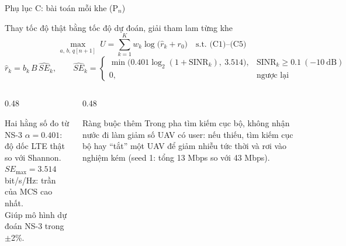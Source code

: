 \documentclass[aspectratio=169,10pt,t]{beamer}
\newcommand{\SE}{\widehat{SE}}
\begin{document}
\begin{frame}{Phụ lục C: bài toán mỗi khe (P$_n$)}
\begin{block}{Thay tốc độ thật bằng tốc độ dự đoán, giải tham lam từng khe}
\vspace{-3mm}
\[
\max_{a,\,b,\,q[n+1]}\ U = \sum_{k=1}^{K} w_k \log\big(\hat r_k + r_0\big)
\quad \text{s.t. (C1)--(C5)}
\]
\vspace{-2mm}
\[
\hat r_k = b_k\, B\, \SE_k,\qquad
\SE_k = \begin{cases}\min\big(0.401\log_2(1+\mathrm{SINR}_k),\ 3.514\big), & \mathrm{SINR}_k \ge 0.1\ (-10\ \text{dB})\\ 0, & \text{ngược lại}\end{cases}
\]
\end{block}
\begin{columns}[T,onlytextwidth]
\begin{column}{0.48\textwidth}
\vspace{0pt}
  \begin{block}{Hai hằng số đo từ NS-3}
    \small
    $\alpha = 0.401$: độ dốc LTE thật so với Shannon.\\
    $SE_{\max} = 3.514$ bit/s/Hz: trần của MCS cao nhất.\\
    Giúp mô hình dự đoán NS-3 trong $\pm$2\%.
  \end{block}
\end{column}
\begin{column}{0.48\textwidth}
\vspace{0pt}
  \begin{block}{Ràng buộc thêm}
    \small
    Trong pha tìm kiếm cục bộ, không nhận nước đi làm giảm số UAV có user: nếu thiếu, tìm kiếm cục bộ hay ``tắt'' một UAV để giảm nhiễu tức thời
    và rơi vào nghiệm kém (seed 1: tổng 13 Mbps so với 43 Mbps).
  \end{block}
\end{column}
\end{columns}
\end{frame}
\end{document}
